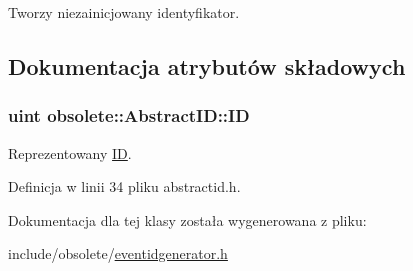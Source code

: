 Tworzy niezainicjowany identyfikator. 



\subsection{Dokumentacja atrybutów składowych}
\hypertarget{classobsolete_1_1AbstractID_a5f67fa1c7d96085f0ef41193b60b570c}{
\subsubsection[{ID}]{\setlength{\rightskip}{0pt plus 5cm}uint {\bf obsolete::AbstractID::ID}}}
\label{classobsolete_1_1AbstractID_a5f67fa1c7d96085f0ef41193b60b570c}


Reprezentowany \hyperlink{classobsolete_1_1ID}{ID}. 



Definicja w linii 34 pliku abstractid.h.



Dokumentacja dla tej klasy została wygenerowana z pliku:\begin{DoxyCompactItemize}
\item 
include/obsolete/\hyperlink{eventidgenerator_8h}{eventidgenerator.h}\end{DoxyCompactItemize}
